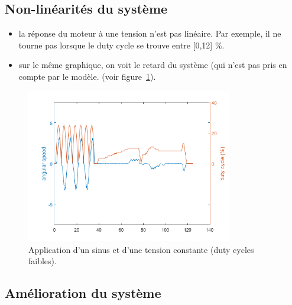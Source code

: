 \documentclass[frenchb, paper=a4, fontsize=11pt]{scrartcl}
\numberwithin{equation}{section}					%
\numberwithin{figure}{section}					%
\numberwithin{table}{section}						%
\begin{document}
\subsection{Non-linéarités du système}
\begin{itemize}
\item la réponse du moteur à une tension n'est pas linéaire. Par exemple, il ne tourne pas lorsque le duty cycle se trouve entre [0,12] \%.
\item sur le même graphique, on voit le retard du système (qui n'est pas
pris en compte par le modèle.
(voir figure~\ref{fig:non_linearities}).
\end{itemize}

\begin{figure}[ht]
	\centering
	\includegraphics[width=0.8\textwidth]{img/non_linearities.png}
	\caption{Application d'un sinus et d'une tension constante (duty cycles faibles).}
	\label{fig:non_linearities}
\end{figure}

\subsection{Amélioration du système}
\end{document}
